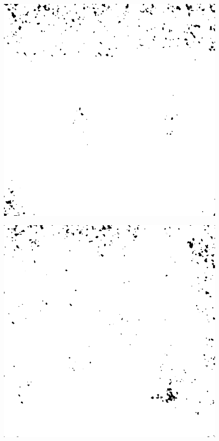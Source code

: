 \begin{figure}[H]
\begin{minipage}[t]{0.3\linewidth}
	\label{fig:car_m15}
\end{minipage}
\begin{minipage}[t]{0.3\linewidth} %
	\includegraphics[width = 1\linewidth]{gfx/hus/hus_m15.png}
	\label{fig:hus_m15}
\end{minipage}
\begin{minipage}[t]{0.3\linewidth} %
	\includegraphics[width = 1\linewidth]{gfx/sit/sit_m15.png}
	\label{fig:sit_m15}
\end{minipage}
\end{figure}
